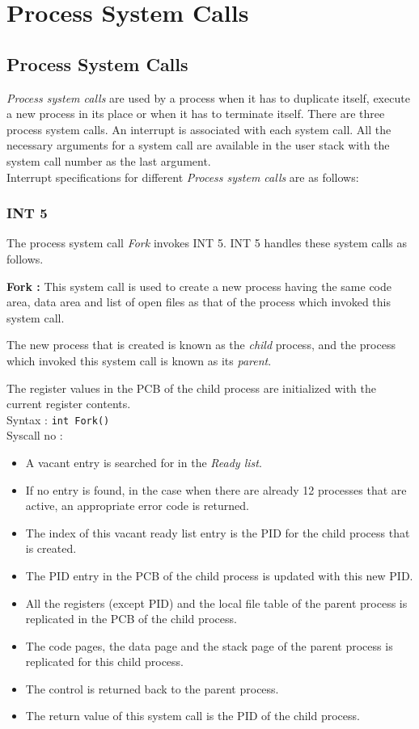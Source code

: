 \chapter{Process System Calls}
\label{chp:process_system_calls}

\section{Process System Calls}
\label{procsyscall}
\textit{Process system calls} are used by a process when it has to duplicate itself, execute a new process in its place or when it has to terminate itself. There are three process system calls. An interrupt is associated with each system call. All the necessary arguments for a system call are available in the user stack with the system call number as the last argument.\\

\noindent Interrupt specifications for different \textit{Process system calls} are as follows:

\subsection{INT 5}
The process system call \textit{Fork} invokes INT 5. INT 5 handles these system calls as follows.

\textbf{Fork :}  This system call is used to create a new process having the same code area, data area and list of open files as that of the process which invoked this system call.

The new process that is created is known as the \emph{child} process, and the process which invoked this system call is known as its \emph{parent}.

The register values in the PCB of the child process are initialized with the current register contents.\\
Syntax : \texttt{int Fork()} \\
Syscall no : 
\begin{itemize}
	\item A vacant entry is searched for in the \emph{Ready list}.
	\item If no entry is found, in the case when there are already 12 processes that are active, an appropriate error code is returned.
	\item The index of this vacant ready list entry is the PID for the child process that is created.
	\item The PID entry in the PCB of the child process is updated with this new PID.
	\item All the registers (except PID) and the local file table of the parent process is replicated in the PCB of the child process.
	\item The code pages, the data page and the stack page of the parent process is replicated for this child process.
	\item The control is returned back to the parent process.
	\item The return value of this system call is the PID of the child process.
\end{itemize}

